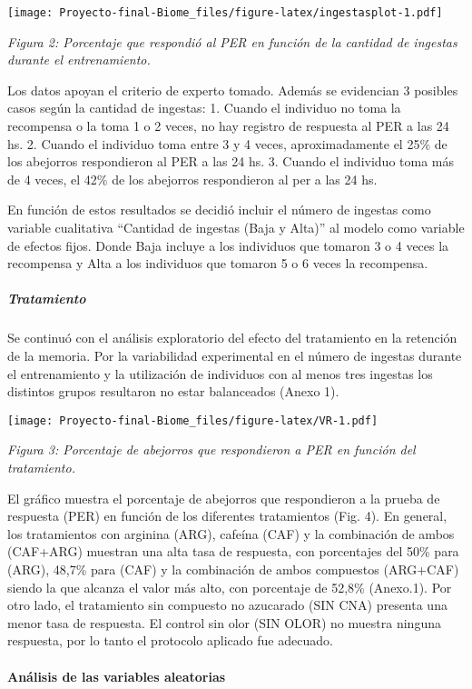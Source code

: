 \documentclass[
  11pt,
]{article}
\begin{document}
\texttt{[image: Proyecto-final-Biome\_files/figure-latex/ingestasplot-1.pdf]}

\emph{Figura 2: Porcentaje que respondió al PER en función de la
cantidad de ingestas durante el entrenamiento.}

Los datos apoyan el criterio de experto tomado. Además se evidencian 3
posibles casos según la cantidad de ingestas: 1. Cuando el individuo no
toma la recompensa o la toma 1 o 2 veces, no hay registro de respuesta
al PER a las 24 hs. 2. Cuando el individuo toma entre 3 y 4 veces,
aproximadamente el 25\% de los abejorros respondieron al PER a las 24
hs. 3. Cuando el individuo toma más de 4 veces, el 42\% de los abejorros
respondieron al per a las 24 hs.

En función de estos resultados se decidió incluir el número de ingestas
como variable cualitativa ``Cantidad de ingestas (Baja y Alta)'' al
modelo como variable de efectos fijos. Donde Baja incluye a los
individuos que tomaron 3 o 4 veces la recompensa y Alta a los individuos
que tomaron 5 o 6 veces la recompensa.

\subparagraph{Tratamiento}\label{tratamiento}

Se continuó con el análisis exploratorio del efecto del tratamiento en
la retención de la memoria. Por la variabilidad experimental en el
número de ingestas durante el entrenamiento y la utilización de
individuos con al menos tres ingestas los distintos grupos resultaron no
estar balanceados (Anexo 1).

\texttt{[image: Proyecto-final-Biome\_files/figure-latex/VR-1.pdf]}

\emph{Figura 3: Porcentaje de abejorros que respondieron a PER en
función del tratamiento.}

El gráfico muestra el porcentaje de abejorros que respondieron a la
prueba de respuesta (PER) en función de los diferentes tratamientos
(Fig. 4). En general, los tratamientos con arginina (ARG), cafeína (CAF)
y la combinación de ambos (CAF+ARG) muestran una alta tasa de respuesta,
con porcentajes del 50\% para (ARG), 48,7\% para (CAF) y la combinación
de ambos compuestos (ARG+CAF) siendo la que alcanza el valor más alto,
con porcentaje de 52,8\% (Anexo.1). Por otro lado, el tratamiento sin
compuesto no azucarado (SIN CNA) presenta una menor tasa de respuesta.
El control sin olor (SIN OLOR) no muestra ninguna respuesta, por lo
tanto el protocolo aplicado fue adecuado.

\paragraph{Análisis de las variables
aleatorias}\label{anuxe1lisis-de-las-variables-aleatorias}
\end{document}
